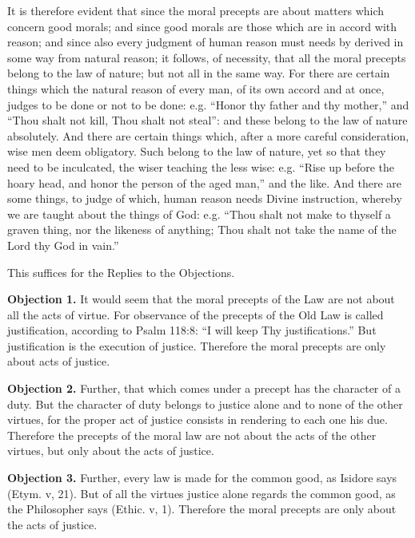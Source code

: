 It is therefore evident that since the moral precepts are about matters which concern good morals; and since good morals are those which are in accord with reason; and since also every judgment of human reason must needs by derived in some way from natural reason; it follows, of necessity, that all the moral precepts belong to the law of nature; but not all in the same way. For there are certain things which the natural reason of every man, of its own accord and at once, judges to be done or not to be done: e.g. ``Honor thy father and thy mother,'' and ``Thou shalt not kill, Thou shalt not steal'': and these belong to the law of nature absolutely. And there are certain things which, after a more careful consideration, wise men deem obligatory. Such belong to the law of nature, yet so that they need to be inculcated, the wiser teaching the less wise: e.g. ``Rise up before the hoary head, and honor the person of the aged man,'' and the like. And there are some things, to judge of which, human reason needs Divine instruction, whereby we are taught about the things of God: e.g. ``Thou shalt not make to thyself a graven thing, nor the likeness of anything; Thou shalt not take the name of the Lord thy God in vain.''

This suffices for the Replies to the Objections.


\textbf{Objection 1.} It would seem that the moral precepts of the Law are not about all the acts of virtue. For observance of the precepts of the Old Law is called justification, according to Psalm 118:8: ``I will keep Thy justifications.'' But justification is the execution of justice. Therefore the moral precepts are only about acts of justice.

\textbf{Objection 2.} Further, that which comes under a precept has the character of a duty. But the character of duty belongs to justice alone and to none of the other virtues, for the proper act of justice consists in rendering to each one his due. Therefore the precepts of the moral law are not about the acts of the other virtues, but only about the acts of justice.

\textbf{Objection 3.} Further, every law is made for the common good, as Isidore says (Etym. v, 21). But of all the virtues justice alone regards the common good, as the Philosopher says (Ethic. v, 1). Therefore the moral precepts are only about the acts of justice.

